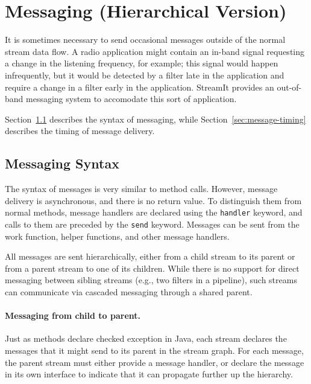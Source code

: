 

\newpage
\section{Messaging (Hierarchical Version)}
\label{sec:messaging}

It is sometimes necessary to send occasional messages outside of the
normal stream data flow.  A radio application might contain an in-band
signal requesting a change in the listening frequency, for example;
this signal would happen infrequently, but it would be detected by a
filter late in the application and require a change in a filter early
in the application.  StreamIt provides an out-of-band messaging system
to accomodate this sort of application.

Section~\ref{sec:message-syntax} describes the syntax of messaging,
while Section~\ref{sec:message-timing} describes the timing of message
delivery.

\subsection{Messaging Syntax}
\label{sec:message-syntax}

The syntax of messages is very similar to method calls.  However,
message delivery is asynchronous, and there is no return value.  To
distinguish them from normal methods, message handlers are declared
using the \lstinline|handler| keyword, and calls to them are preceded
by the \lstinline|send| keyword.  Messages can be sent from the work
function, helper functions, and other message handlers.

All messages are sent hierarchically, either from a child stream to
its parent or from a parent stream to one of its children.  While
there is no support for direct messaging between sibling streams
(e.g., two filters in a pipeline), such streams can communicate via
cascaded messaging through a shared parent.

\paragraph{Messaging from child to parent.} Just as methods declare 
checked exception in Java, each stream declares the messages that it
might send to its parent in the stream graph.  For each message, the
parent stream must either provide a message handler, or declare the
message in its own interface to indicate that it can propagate further
up the hierarchy.

